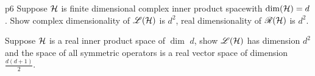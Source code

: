 \documentclass[a4paper, 11pt]{article}
\newcommand{\fdcps}{finite dimensional complex inner product space}
\begin{document}

\begin{problem}{%
	}{p6%
	}
	Suppose $\mathcal{H}$ is \fdcps with $\dim(\mathcal{H})=d$. Show complex dimensionality of ${\mathscr{L}}(\mathcal{H})$ is $d^2$, real dimensionality of ${\mathscr{R}}(\mathcal{H})$ is $d^2$.\parinn
	
	Suppose $\mathcal{H}$ is a real inner product space of $\dim$ $d$, show ${\mathscr{L}}(\mathcal{H})$ has dimension $d^2$ and  the space of all symmetric operators  is a real vector space of dimension $\frac{d(d+1)}{2}$.
\end{problem}
\end{document}
